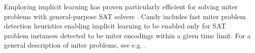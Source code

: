\documentclass[conference]{IEEEtran}
\begin{document}
Employing implicit learning has proven particularly efficient for solving miter problems with general-purpose SAT solvers \cite{Kutzer:2016:Thesis}.
Candy includes fast miter problem detection heuristics enabling implicit learning to be enabled only for SAT problem instances detected to be miter encodings within a given time limit.
For a general description of miter problems, see e.g. \cite{hwmcc12Bench}.


%

\end{document}
